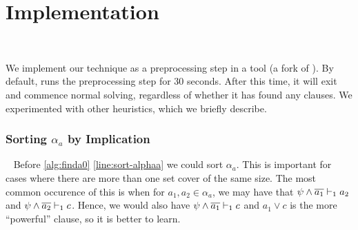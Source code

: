 \section{Implementation}~\label{sec:implementation}

We implement our technique as a preprocessing step in a tool \tool (a fork of \cadical
). By default, \tool runs the preprocessing step for
30 seconds. After this time, it will exit and commence normal solving,
regardless of whether it has found any \pr clauses. 
 We experimented with other heuristics, which we briefly describe.





\subsubsection{Sorting $\alpha_a$ by Implication}~\label{subsubsec:impordering}
Before \autoref{alg:finda0} \autoref{line:sort-alphaa} we could sort $\alpha_a$.
This is important for cases where there are more than one set cover of the same
size. The most common occurence of this is when for $a_1, a_2 \in \alpha_a$, we
may have that $\psi \land \overline{a_1} \vdash_1 a_2$ and
$\psi \land \overline{a_2} \vdash_1 c$. Hence, we would also have $\psi \land \overline{a_1} \vdash_1 c$
and $a_1 \lor c$ is the more ``powerful'' clause, so it is better to learn.

